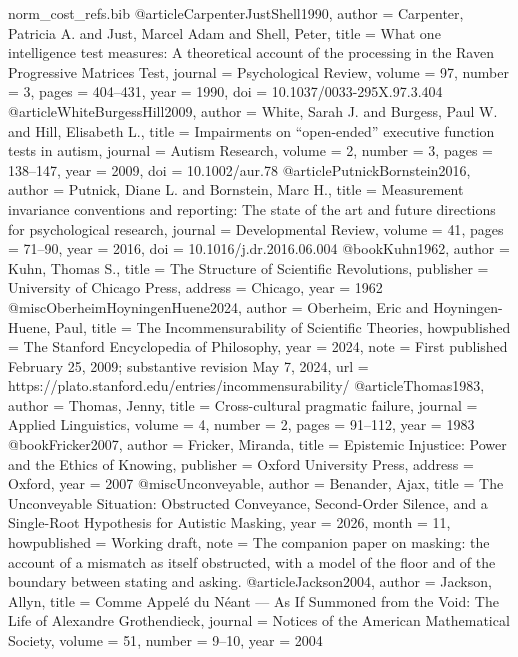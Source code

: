 \begin{filecontents}[overwrite]{norm_cost_refs.bib}
@article{CarpenterJustShell1990,
  author = {Carpenter, Patricia A. and Just, Marcel Adam and Shell, Peter},
  title = {What one intelligence test measures: A theoretical account of the processing in the {Raven} {Progressive} {Matrices} {Test}},
  journal = {Psychological Review}, volume = {97}, number = {3}, pages = {404--431}, year = {1990},
  doi = {10.1037/0033-295X.97.3.404}}
@article{WhiteBurgessHill2009,
  author = {White, Sarah J. and Burgess, Paul W. and Hill, Elisabeth L.},
  title = {Impairments on ``open-ended'' executive function tests in autism},
  journal = {Autism Research}, volume = {2}, number = {3}, pages = {138--147}, year = {2009},
  doi = {10.1002/aur.78}}
@article{PutnickBornstein2016,
  author = {Putnick, Diane L. and Bornstein, Marc H.},
  title = {Measurement invariance conventions and reporting: The state of the art and future directions for psychological research},
  journal = {Developmental Review}, volume = {41}, pages = {71--90}, year = {2016},
  doi = {10.1016/j.dr.2016.06.004}}
@book{Kuhn1962,
  author = {Kuhn, Thomas S.},
  title = {The Structure of Scientific Revolutions},
  publisher = {University of Chicago Press}, address = {Chicago}, year = {1962}}
@misc{OberheimHoyningenHuene2024,
  author = {Oberheim, Eric and Hoyningen-Huene, Paul},
  title = {The Incommensurability of Scientific Theories},
  howpublished = {The Stanford Encyclopedia of Philosophy},
  year = {2024},
  note = {First published February 25, 2009; substantive revision May 7, 2024},
  url = {https://plato.stanford.edu/entries/incommensurability/}}
@article{Thomas1983,
  author = {Thomas, Jenny},
  title = {Cross-cultural pragmatic failure},
  journal = {Applied Linguistics}, volume = {4}, number = {2}, pages = {91--112}, year = {1983}}
@book{Fricker2007,
  author = {Fricker, Miranda},
  title = {Epistemic Injustice: Power and the Ethics of Knowing},
  publisher = {Oxford University Press}, address = {Oxford}, year = {2007}}
@misc{Unconveyable,
  author = {Benander, Ajax},
  title = {The Unconveyable Situation: Obstructed Conveyance, Second-Order Silence, and a Single-Root Hypothesis for Autistic Masking},
  year = {2026}, month = {11},
  howpublished = {Working draft},
  note = {The companion paper on masking: the account of a mismatch as itself obstructed, with a model of the floor and of the boundary between stating and asking.}}
@article{Jackson2004,
  author = {Jackson, Allyn},
  title = {Comme Appel\'e du N\'eant --- As If Summoned from the Void: The Life of Alexandre Grothendieck},
  journal = {Notices of the American Mathematical Society}, volume = {51}, number = {9--10}, year = {2004}}
\end{filecontents}
